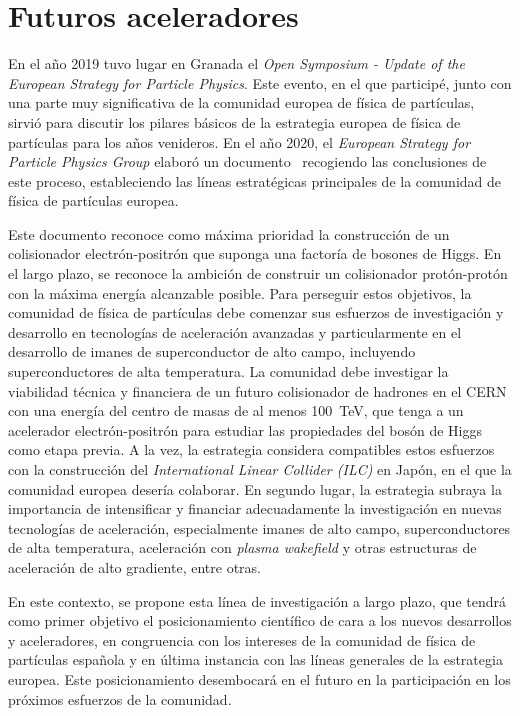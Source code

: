 \section{Futuros aceleradores}

En el año 2019 tuvo lugar en Granada el \emph{Open Symposium - Update of the European Strategy for Particle Physics}. Este evento, en el que participé, junto con una parte muy significativa de la comunidad europea de física de partículas, sirvió para discutir los pilares básicos de la estrategia europea de física de partículas para los años venideros. En el año 2020, el \emph{European Strategy for Particle Physics Group} elaboró un documento~\cite{future} recogiendo las conclusiones de este proceso, estableciendo las líneas estratégicas principales de la comunidad de física de partículas europea. 

Este documento reconoce como máxima prioridad la construcción de un colisionador electrón-positrón que suponga una factoría de bosones de Higgs. En el largo plazo, se reconoce la ambición de construir un colisionador protón-protón con la máxima energía alcanzable posible. Para perseguir estos objetivos, la comunidad de física de partículas debe comenzar sus esfuerzos de investigación y desarrollo en tecnologías de aceleración avanzadas y particularmente en el desarrollo de imanes de superconductor de alto campo, incluyendo superconductores de alta temperatura. La comunidad debe investigar la viabilidad técnica y financiera de un futuro colisionador de hadrones en el CERN con una energía del centro de masas de al menos 100~TeV, que tenga a un acelerador electrón-positrón para estudiar las propiedades del bosón de Higgs como etapa previa. A la vez, la estrategia considera compatibles estos esfuerzos con la construcción del \emph{International Linear Collider (ILC)} en Japón, en el que la comunidad europea desería colaborar. En segundo lugar, la estrategia subraya la importancia de intensificar y financiar adecuadamente la investigación en nuevas tecnologías de aceleración, especialmente imanes de alto campo, superconductores de alta temperatura, aceleración con \emph{plasma wakefield} y otras estructuras de aceleración de alto gradiente, entre otras. 

En este contexto, se propone esta línea de investigación a largo plazo, que tendrá como primer objetivo el posicionamiento científico de cara a los nuevos desarrollos y aceleradores, en congruencia con los intereses de la comunidad de física de partículas española y en última instancia con las líneas generales de la estrategia europea. Este posicionamiento desembocará en el futuro en la participación en los próximos esfuerzos de la comunidad.





